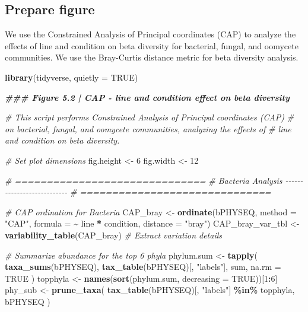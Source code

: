 \documentclass[
  11pt,
]{article}
\newenvironment{Shaded}{\begin{snugshade}}{\end{snugshade}}
\newcommand{\AttributeTok}[1]{\textcolor[rgb]{0.13,0.29,0.53}{#1}}
\newcommand{\CommentTok}[1]{\textcolor[rgb]{0.56,0.35,0.01}{\textit{#1}}}
\newcommand{\ConstantTok}[1]{\textcolor[rgb]{0.56,0.35,0.01}{#1}}
\newcommand{\DecValTok}[1]{\textcolor[rgb]{0.00,0.00,0.81}{#1}}
\newcommand{\DocumentationTok}[1]{\textcolor[rgb]{0.56,0.35,0.01}{\textbf{\textit{#1}}}}
\newcommand{\FunctionTok}[1]{\textcolor[rgb]{0.13,0.29,0.53}{\textbf{#1}}}
\newcommand{\NormalTok}[1]{#1}
\newcommand{\OtherTok}[1]{\textcolor[rgb]{0.56,0.35,0.01}{#1}}
\newcommand{\SpecialCharTok}[1]{\textcolor[rgb]{0.81,0.36,0.00}{\textbf{#1}}}
\newcommand{\StringTok}[1]{\textcolor[rgb]{0.31,0.60,0.02}{#1}}
\begin{document}
\subsection{Prepare figure}\label{prepare-figure}

We use the Constrained Analysis of Principal coordinates (CAP) to
analyze the effects of line and condition on beta diversity for
bacterial, fungal, and oomycete communities. We use the Bray-Curtis
distance metric for beta diversity analysis.

\begin{Shaded}
\begin{Highlighting}[]
\FunctionTok{library}\NormalTok{(tidyverse, }\AttributeTok{quietly =} \ConstantTok{TRUE}\NormalTok{)}

\DocumentationTok{\#\#\# Figure 5.2 | CAP {-} line and condition effect on beta diversity}

\CommentTok{\# This script performs Constrained Analysis of Principal coordinates (CAP)}
\CommentTok{\# on bacterial, fungal, and oomycete communities, analyzing the effects of }
\CommentTok{\# line and condition on beta diversity.}

\CommentTok{\# Set plot dimensions}
\NormalTok{fig.height }\OtherTok{\textless{}{-}} \DecValTok{6}
\NormalTok{fig.width }\OtherTok{\textless{}{-}} \DecValTok{12}

\CommentTok{\# ==============================}
\CommentTok{\# Bacteria Analysis {-}{-}{-}{-}{-}{-}{-}{-}{-}{-}{-}{-}{-}{-}{-}{-}{-}{-}{-}{-}{-}{-}{-}{-}{-}{-}{-}}
\CommentTok{\# ==============================}

\CommentTok{\# CAP ordination for Bacteria}
\NormalTok{CAP\_bray }\OtherTok{\textless{}{-}} \FunctionTok{ordinate}\NormalTok{(bPHYSEQ, }\AttributeTok{method =} \StringTok{"CAP"}\NormalTok{, }\AttributeTok{formula =} \SpecialCharTok{\textasciitilde{}}\NormalTok{ line }\SpecialCharTok{*}\NormalTok{ condition, }\AttributeTok{distance =} \StringTok{"bray"}\NormalTok{)}
\NormalTok{CAP\_bray\_var\_tbl }\OtherTok{\textless{}{-}} \FunctionTok{variability\_table}\NormalTok{(CAP\_bray)  }\CommentTok{\# Extract variation details}

\CommentTok{\# Summarize abundance for the top 6 phyla}
\NormalTok{phylum.sum }\OtherTok{\textless{}{-}} \FunctionTok{tapply}\NormalTok{(}
  \FunctionTok{taxa\_sums}\NormalTok{(bPHYSEQ), }
  \FunctionTok{tax\_table}\NormalTok{(bPHYSEQ)[, }\StringTok{"labels"}\NormalTok{], }
\NormalTok{  sum, }
  \AttributeTok{na.rm =} \ConstantTok{TRUE}
\NormalTok{)}
\NormalTok{topphyla }\OtherTok{\textless{}{-}} \FunctionTok{names}\NormalTok{(}\FunctionTok{sort}\NormalTok{(phylum.sum, }\AttributeTok{decreasing =} \ConstantTok{TRUE}\NormalTok{))[}\DecValTok{1}\SpecialCharTok{:}\DecValTok{6}\NormalTok{]}
\NormalTok{phy\_sub }\OtherTok{\textless{}{-}} \FunctionTok{prune\_taxa}\NormalTok{(}
  \FunctionTok{tax\_table}\NormalTok{(bPHYSEQ)[, }\StringTok{"labels"}\NormalTok{] }\SpecialCharTok{\%in\%}\NormalTok{ topphyla, }
\NormalTok{  bPHYSEQ}
\NormalTok{)}


\end{Highlighting}
\end{Shaded}
\end{document}
